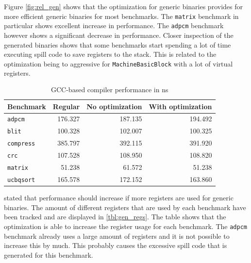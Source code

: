 Figure \ref{fig:rel_gen} shows that the optimization for generic binaries provides for more efficient generic binaries for most benchmarks. The \texttt{matrix} benchmark in particular shows excellent increase in performance. The \texttt{adpcm} benchmark however shows a significant decrease in performance. Closer inspection of the generated binaries shows that some benchmarks start spending a lot of time executing spill code to save registers to the stack. This is related to the optimization being to aggressive for \texttt{MachineBasicBlock} with a lot of virtual registers.

\begin{table}
  \centering
    \begin{tabular}{|l|r|r|r|}
    \hline
    \textbf{Benchmark} & \multicolumn{1}{|r|}{\textbf{Regular}} & \multicolumn{1}{|r|}{\textbf{No optimization}} & \multicolumn{1}{|r|}{\textbf{With optimization}} \\ \hline
	\texttt{adpcm} 		&  176.327 	&	 187.135 	&	 194.492 	\\ \hline
	\texttt{blit} 		&  100.328 	&	 102.007 	&	 100.325 	\\ \hline
	\texttt{compress} 	&  385.797 	&	 392.115 	&	 391.920 	\\ \hline
	\texttt{crc} 		&  107.528 	&	 108.950 	&	 108.820 	\\ \hline
	\texttt{matrix} 	&  51.238 	&	 61.572 	&	 51.238 	\\ \hline
	\texttt{ucbqsort} 	&  165.578 	&	 172.152 	&	 163.860 	\\ \hline
    \end{tabular}
  \caption{GCC-based compiler performance in ns}
  \label{tbl:GCC_perf}
\end{table}

\cite{Anthony-Brandon:2013jk} stated that performance should increase if more registers are used for generic binaries. The amount of different registers that are used by each benchmark have been tracked and are displayed in \ref{tbl:gen_regs}. The table shows that the optimization is able to increase the register usage for each benchmark. The \texttt{adpcm} benchmark already uses a large amount of registers and it is not possible to increase this by much. This probably causes the excessive spill code that is generated for this benchmark.

